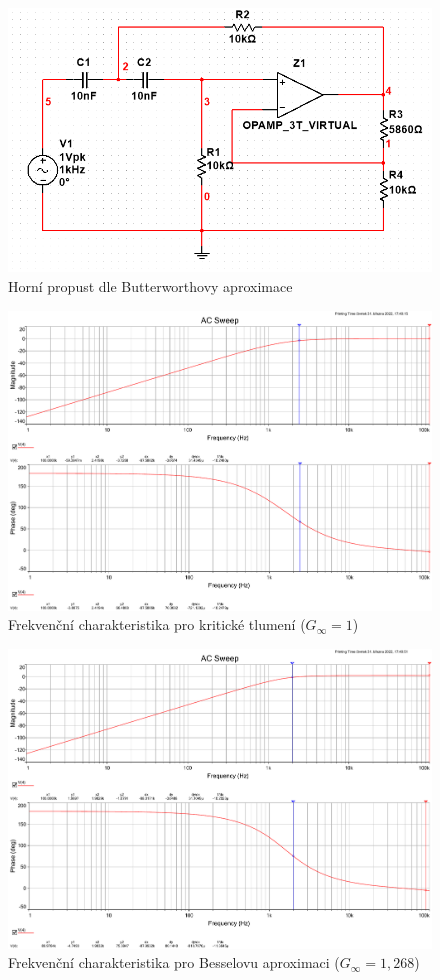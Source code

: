 \documentclass[twoside]{article}
\begin{document}
\begin{figure}[h!]
    \centering
    \includegraphics[width=0.55\linewidth]{bode_schema.png}
    \caption{Horní propust dle Butterworthovy aproximace}
    \label{fig:schema_bode}
\end{figure}

\newpage
\begin{figure}[h!]
    \centering
    \includegraphics[width=0.92\linewidth]{bode_kriticke.pdf}
    \caption{Frekvenční charakteristika pro kritické tlumení ($G_{\infty} = 1$)}
    \label{fig:bode_kriticke}
\end{figure}

\begin{figure}[h!]
    \centering
    \includegraphics[width=0.92\linewidth]{bode_bessel.pdf}
    \caption{Frekvenční charakteristika pro Besselovu aproximaci ($G_{\infty} = 1,268$)}
    \label{fig:bode_bessel}
\end{figure}
\end{document}
